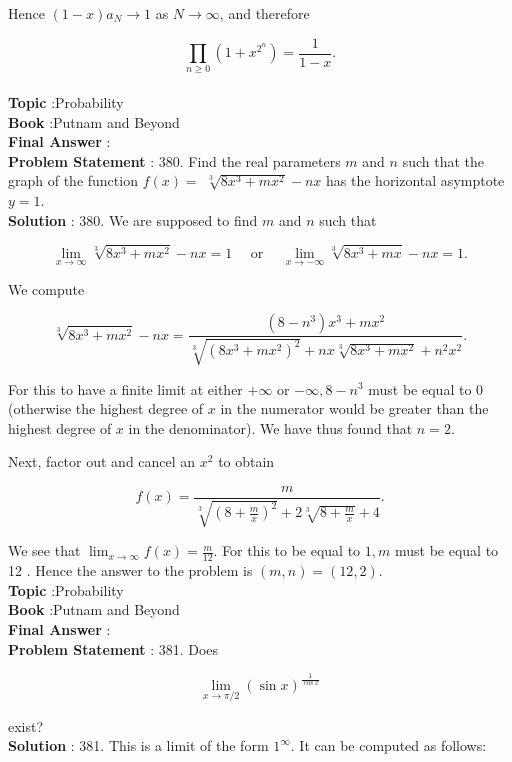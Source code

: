 \documentclass[10pt]{article}
\begin{document}
Hence $(1-x) a_{N} \rightarrow 1$ as $N \rightarrow \infty$, and therefore

$$
\prod_{n \geq 0}\left(1+x^{2^{n}}\right)=\frac{1}{1-x} .
$$
\\
\textbf{Topic} :Probability\\
\textbf{Book} :Putnam and Beyond\\
\textbf{Final Answer} :\\


\textbf{Problem Statement} :
380. Find the real parameters $m$ and $n$ such that the graph of the function $f(x)=$ $\sqrt[3]{8 x^{3}+m x^{2}}-n x$ has the horizontal asymptote $y=1$. 
\\
\textbf{Solution} :
380. We are supposed to find $m$ and $n$ such that

$$
\lim _{x \rightarrow \infty} \sqrt[3]{8 x^{3}+m x^{2}}-n x=1 \quad \text { or } \quad \lim _{x \rightarrow-\infty} \sqrt[3]{8 x^{3}+m x}-n x=1 .
$$

We compute

$$
\sqrt[3]{8 x^{3}+m x^{2}}-n x=\frac{\left(8-n^{3}\right) x^{3}+m x^{2}}{\sqrt[3]{\left(8 x^{3}+m x^{2}\right)^{2}}+n x \sqrt[3]{8 x^{3}+m x^{2}}+n^{2} x^{2}} .
$$

For this to have a finite limit at either $+\infty$ or $-\infty, 8-n^{3}$ must be equal to 0 (otherwise the highest degree of $x$ in the numerator would be greater than the highest degree of $x$ in the denominator). We have thus found that $n=2$.

Next, factor out and cancel an $x^{2}$ to obtain

$$
f(x)=\frac{m}{\sqrt[3]{\left(8+\frac{m}{x}\right)^{2}}+2 \sqrt[3]{8+\frac{m}{x}}+4} .
$$

We see that $\lim _{x \rightarrow \infty} f(x)=\frac{m}{12}$. For this to be equal to $1, m$ must be equal to 12 . Hence the answer to the problem is $(m, n)=(12,2)$.
\\
\textbf{Topic} :Probability\\
\textbf{Book} :Putnam and Beyond\\
\textbf{Final Answer} :\\


\textbf{Problem Statement} :
381. Does

$$
\lim _{x \rightarrow \pi / 2}(\sin x)^{\frac{1}{\cos x}}
$$

exist?
\\
\textbf{Solution} :
381. This is a limit of the form $1^{\infty}$. It can be computed as follows:
\end{document}
